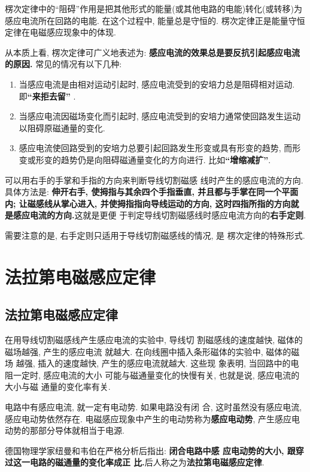 \documentclass[11pt,a4paper]{ctexbook}
\begin{document}
楞次定律中的``阻碍''作用是把其他形式的能量(或其他电路的电能)转化(或转移)为感应电流所在回路的电能.
在这个过程中, 能量总是守恒的. 楞次定律正是能量守恒定律在电磁感应现象中的体现.

从本质上看, 楞次定律可广义地表述为:
\textbf{感应电流的效果总是要反抗引起感应电流的原因. }常见的情况有以下几种:
\begin{enumerate}
    \item 当感应电流是由相对运动引起时, 感应电流受到的安培力总是阻碍相对运动. 即\textbf{``来拒去留'' }.
    \item 当感应电流因磁场变化而引起时, 感应电流受到的安培力通常使回路发生运动以阻碍原磁通量的变化.
    \item 感应电流使回路受到的安培力总要引起回路发生形变或具有形变的趋势, 而形变或形变的趋势仍是向阻碍磁通量变化的方向进行. 比如\textbf{``增缩减扩''}.
\end{enumerate}

可以用右手的手掌和手指的方向来判断导线切割磁感
线时产生的感应电流的方向. 具体方法是: \textbf{伸开右手,
使拇指与其余四个手指垂直, 并且都与手掌在同一个平面
内; 让磁感线从掌心进入, 并使拇指指向导线运动的方向,
这时四指所指的方向就是感应电流的方向.}这就是更便
于判定导线切割磁感线时感应电流方向的\textbf{右手定则}.

需要注意的是, 右手定则只适用于导线切割磁感线的情况, 是
楞次定律的特殊形式.

\section{法拉第电磁感应定律}

\subsection{法拉第电磁感应定律}

在用导线切割磁感线产生感应电流的实验中, 导线切
割磁感线的速度越快, 磁体的磁场越强, 产生的感应电流
就越大. 在向线圈中插入条形磁体的实验中, 磁体的磁场
越强, 插入的速度越快, 产生的感应电流就越大. 这些现
象表明, 当回路中的电阻一定时, 感应电流的大小
可能与磁通量变化的快慢有关, 也就是说, 感应电流的大小与磁
通量的变化率有关.

电路中有感应电流, 就一定有电动势. 如果电路没有闭
合, 这时虽然没有感应电流, 感应电动势依然存在.
电磁感应现象中产生的电动势称为\textbf{感应电动势},
产生感应电动势的那部分导体就相当于电源.

德国物理学家纽曼和韦伯在严格分析后指出: \textbf{闭合电路中感
应电动势的大小, 跟穿过这一电路的磁通量的变化率成正
比.}后人称之为\textbf{法拉第电磁感应定律}.
\end{document}
